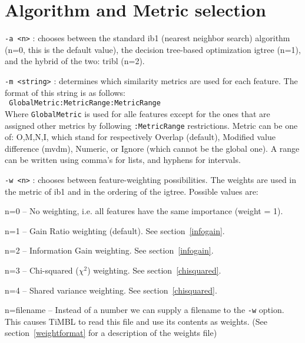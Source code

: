 \documentclass{report}
\begin{document}
\section{Algorithm and Metric selection}

\begin{description}

\item {\tt -a <n>} : chooses between the standard {\sc ib1} (nearest
neighbor search) algorithm (n=0, this is the default value), the
decision tree-based optimization {\sc igtree} (n=1), and the hybrid of
the two: {\sc tribl} (n=2).

\item {\tt -m <string>} : determines which similarity metrics are used
for each feature. The format of this string is as follows:\\ {\tt
GlobalMetric:MetricRange:MetricRange}\\ Where {\tt GlobalMetric} is
used for alle features except for the ones that are assigned other
metrics by following {\tt :MetricRange} restrictions. Metric can be
one of: O,M,N,I, which stand for respectively Overlap (default),
Modified value difference ({\sc mvdm}), Numeric, or Ignore (which
cannot be the global one). A range can be written using comma's for
lists, and hyphens for intervals.

\item {\tt -w <n>} : chooses between feature-weighting possibilities.
The weights are used in the metric of {\sc ib1} and in the ordering of the
{\sc igtree}. Possible values are:

	\begin{description}
	\item n=0 -- No weighting, i.e. all features have the same
	importance (weight = 1).
	\item n=1 -- Gain Ratio weighting (default). See section~\ref{infogain}.
	\item n=2 -- Information Gain weighting. See section~\ref{infogain}.
	\item n=3 -- Chi-squared ($\chi^2$) weighting. See section~\ref{chisquared}.
	\item n=4 -- Shared variance weighting. See section~\ref{chisquared}.
	\item n=filename -- Instead of a number we can supply a
	filename to the {\tt -w} option. This causes TiMBL to read this file
	and use its contents as weights. (See section~\ref{weightformat} for a
	description of the weights file)
	\end{description}


\end{description}
\end{document}
